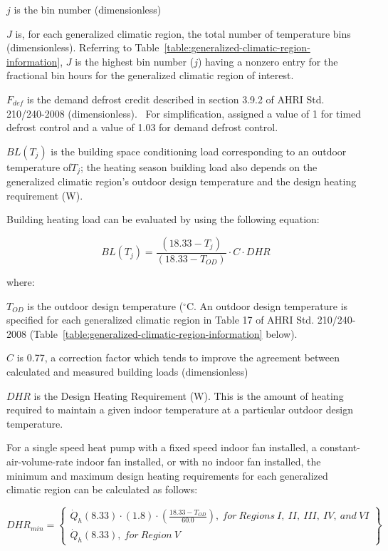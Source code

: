\(j\) is the bin number (dimensionless)

\(J\) is, for each generalized climatic region, the total number of temperature bins (dimensionless). Referring to Table~\ref{table:generalized-climatic-region-information}, \(J\) is the highest bin number (\(j\)) having a nonzero entry for the fractional bin hours for the generalized climatic region of interest.

\({F_{def}}\) is the demand defrost credit described in section 3.9.2 of AHRI Std. 210/240-2008 (dimensionless).~ For simplification, assigned a value of 1 for timed defrost control and a value of 1.03 for demand defrost control.

\(BL({T_j})\) is the building space conditioning load corresponding to an outdoor temperature of\({T_j}\); the heating season building load also depends on the generalized climatic region's outdoor design temperature and the design heating requirement (W).

Building heating load can be evaluated by using the following equation:

\begin{equation}
  BL({T_j}) = \frac{{\left( {18.33 - {T_j}} \right)}}{{\left( {18.33 - {T_{OD}}} \right)}} \cdot C \cdot DHR
\end{equation}

where:

\(T_{OD}\) is the outdoor design temperature (\(^{\circ}\)C. An outdoor design temperature is specified for each generalized climatic region in Table 17 of AHRI Std. 210/240-2008 (Table~\ref{table:generalized-climatic-region-information} below).

\(C\) is 0.77, a correction factor which tends to improve the agreement between calculated and measured building loads (dimensionless)

\(DHR\) is the Design Heating Requirement (W). This is the amount of heating required to maintain a given indoor temperature at a particular outdoor design temperature.

For a single speed heat pump with a fixed speed indoor fan installed, a constant-air-volume-rate indoor fan installed, or with no indoor fan installed, the minimum and maximum design heating requirements for each generalized climatic region can be calculated as follows:

\begin{equation}
  DHR_{min} =
  \left\{
    \begin{array}{l}
      {\dot{Q}_h}(8.33) \cdot (1.8) \cdot \left( {\frac{{18.33 - {T_{OD}}}}{{60.0}}} \right), {~for~Regions~I,~II,~III,~IV,~and~VI} \\
      {\dot{Q}_h}(8.33),{~for~Region~V}
    \end{array}
  \right\}
\end{equation}


